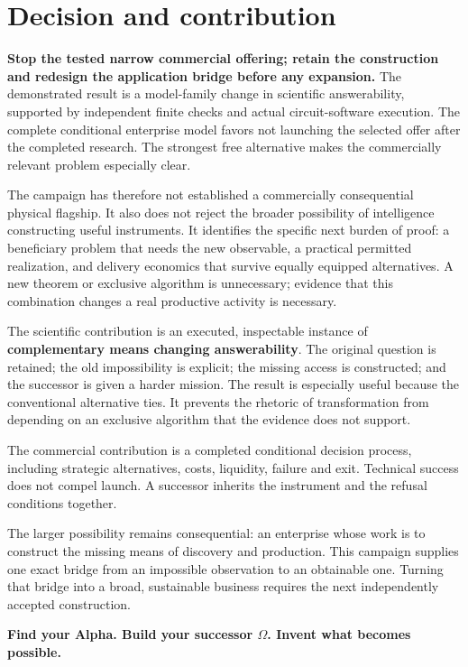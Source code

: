 \documentclass[
  11pt,
]{article}
\begin{document}
\hypertarget{decision-and-contribution}{%
\section{Decision and contribution}\label{decision-and-contribution}}

\textbf{Stop the tested narrow commercial offering; retain the
construction and redesign the application bridge before any expansion.}
The demonstrated result is a model-family change in scientific
answerability, supported by independent finite checks and actual
circuit-software execution. The complete conditional enterprise model
favors not launching the selected offer after the completed research.
The strongest free alternative makes the commercially relevant problem
especially clear.

The campaign has therefore not established a commercially consequential
physical flagship. It also does not reject the broader possibility of
intelligence constructing useful instruments. It identifies the specific
next burden of proof: a beneficiary problem that needs the new
observable, a practical permitted realization, and delivery economics
that survive equally equipped alternatives. A new theorem or exclusive
algorithm is unnecessary; evidence that this combination changes a real
productive activity is necessary.

The scientific contribution is an executed, inspectable instance of
\textbf{complementary means changing answerability}. The original
question is retained; the old impossibility is explicit; the missing
access is constructed; and the successor is given a harder mission. The
result is especially useful because the conventional alternative ties.
It prevents the rhetoric of transformation from depending on an
exclusive algorithm that the evidence does not support.

The commercial contribution is a completed conditional decision process,
including strategic alternatives, costs, liquidity, failure and exit.
Technical success does not compel launch. A successor inherits the
instrument and the refusal conditions together.

The larger possibility remains consequential: an enterprise whose work
is to construct the missing means of discovery and production. This
campaign supplies one exact bridge from an impossible observation to an
obtainable one. Turning that bridge into a broad, sustainable business
requires the next independently accepted construction.

\textbf{Find your Alpha. Build your successor \(\Omega\). Invent what
becomes possible.}
\end{document}

